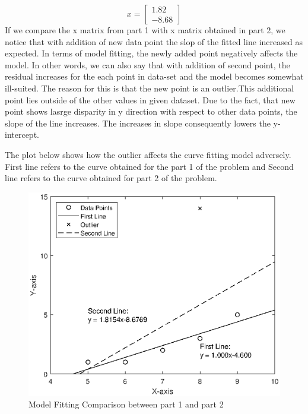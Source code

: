 \documentclass{article}
\begin{document}
\begin{equation}
x=
\begin{bmatrix}
1.82\\-8.68
\end{bmatrix}
\end{equation}
If we compare the x matrix from part 1 with x matrix obtained in part 2, we notice that with addition of new data point the slop of the fitted line increased as expected. In terms of model fitting, the newly added point negatively affects the model. In other words, we can also say that with addition of second point, the residual increases for the each point in data-set and the model becomes somewhat ill-suited.
The reason for this is that the new point is an outlier.This additional point lies outside of the other values in given dataset. Due to the fact, that new point shows lasrge disparity in y direction with respect to other data points, the slope of the line increases. The increases in slope consequently lowers the y-intercept.

The plot below shows how the outlier affects the curve fitting model adversely. First line refers to the curve obtained for the part 1 of the problem and Second line refers to the curve obtained for part 2 of the problem.\\
\begin{figure}[!htb]
\centering
\includegraphics[scale=0.75]{part2.eps}
\caption{Model Fitting Comparison between part 1 and part 2}
\label{fig:part2}
\end{figure}
\end{document}

